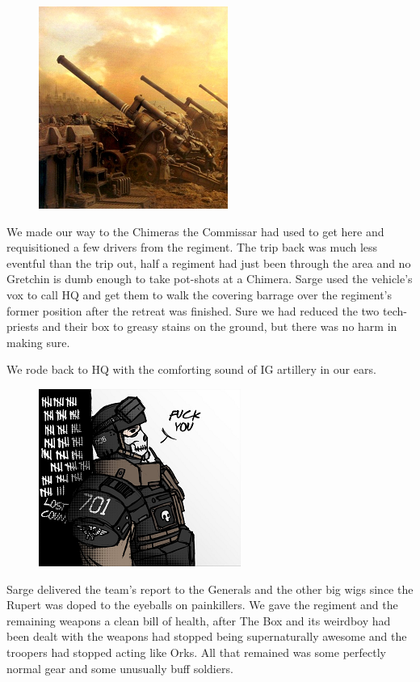 \begin{figure}
	\begin{center}
		\includegraphics[width=\figwidth]{pics/4/32.png}
	\end{center}
\end{figure}
We made our way to the Chimeras the Commissar had used to get here and requisitioned a few drivers from the regiment.
The trip back was much less eventful than the trip out, half a regiment had just been through the area and no Gretchin is dumb enough to take pot-shots at a Chimera. 
Sarge used the vehicle's vox to call HQ and get them to walk the covering barrage over the regiment's former position after the retreat was finished. 
Sure we had reduced the two tech-priests and their box to greasy stains on the ground, but there was no harm in making sure.

We rode back to HQ with the comforting sound of IG artillery in our ears.

\begin{figure}
	\begin{center}
		\includegraphics[width=\figwidth]{pics/4/33.png}
	\end{center}
\end{figure}
Sarge delivered the team's report to the Generals and the other big wigs since the Rupert was doped to the eyeballs on painkillers.
We gave the regiment and the remaining weapons a clean bill of health, after The Box and its weirdboy had been dealt with the weapons had stopped being supernaturally awesome and the troopers had stopped acting like Orks. 
All that remained was some perfectly normal gear and some unusually buff soldiers.

